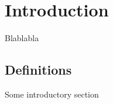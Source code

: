 \chapter{Introduction}
\label{chapt:Introduction}
Blablabla

\section{Definitions}
Some introductory section

